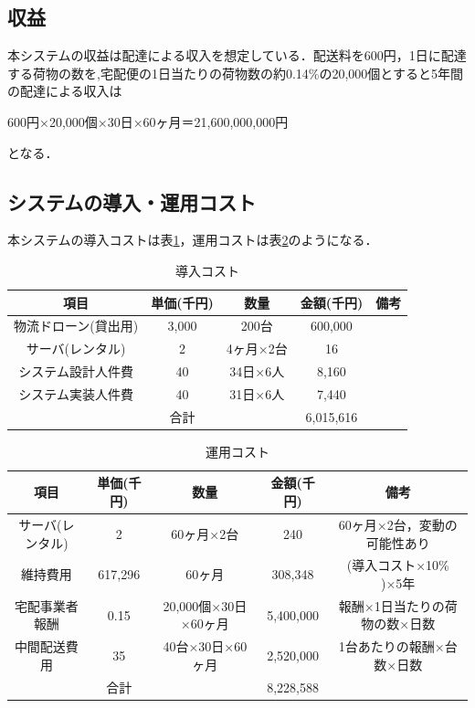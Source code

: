 \documentclass[a4paper, titlepage]{jsarticle}
\begin{document}
\subsection{収益}
本システムの収益は配達による収入を想定している．配送料を600円，1日に配達する荷物の数を,宅配便の1日当たりの荷物数の約0.14\%の20,000個とすると5年間の配達による収入は
\begin{center}
  600円×20,000個×30日×60ヶ月＝21,600,000,000円
\end{center}
となる．

\subsection{システムの導入・運用コスト}
本システムの導入コストは表\ref{tab:label1}，運用コストは表\ref{tab:label2}のようになる．
\begin{table}[H]
  \centering
  \caption{導入コスト}
  \begin{tabular}{c c c c c}
    \hline
    項目 & 単価(千円) & 数量 & 金額(千円) & 備考 \\
    \hline \hline
    物流ドローン(貸出用) & 3,000 & 200台 & 600,000 & \\
    サーバ(レンタル) & 2 & 4ヶ月×2台 & 16 & \\
    システム設計人件費 & 40 & 34日×6人 & 8,160 & \\
    システム実装人件費 & 40 & 31日×6人 & 7,440 & \\
    \hline \hline
    & 合計 & & 6,015,616 & \\
    \hline
  \end{tabular}
  \label{tab:label1}
\end{table}

\begin{table}[H]
  \centering
  \caption{運用コスト}
  \begin{tabular}{c c c c c}
    \hline
    項目 & 単価(千円) & 数量 & 金額(千円) & 備考 \\
    \hline \hline
    サーバ(レンタル) & 2 & 60ヶ月×2台 & 240 & 60ヶ月×2台，変動の可能性あり \\
    維持費用 & 617,296 & 60ヶ月 & 308,348 & (導入コスト×10\% )×5年 \\
    宅配事業者報酬 & 0.15 & 20,000個×30日×60ヶ月 & 5,400,000 & 報酬×1日当たりの荷物の数×日数 \\
    中間配送費用 & 35 & 40台×30日×60ヶ月 & 2,520,000 & 1台あたりの報酬×台数×日数 \\
    \hline \hline
    & 合計 & & 8,228,588 & \\
    \hline
  \end{tabular}
  \label{tab:label2}
\end{table}
\end{document}
